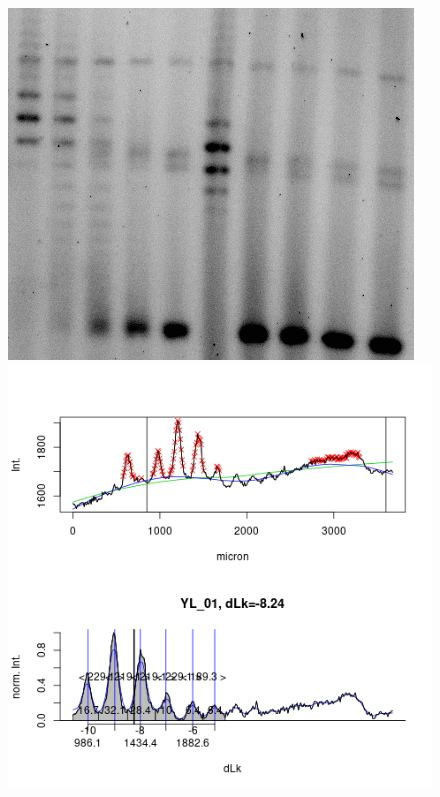 \documentclass[10pt,a4]{article}
\begin{document}
\begin{figure}
  \begin{minipage}{.27\textwidth}
    \includegraphics[width=\textwidth]{figures/diurnal/Y_CQ20_topoI_zoom_inv.png}
  \end{minipage}
  \begin{minipage}{.33\textwidth}
    \includegraphics[width=\textwidth]{figures/diurnal/YL_01.png}

\end{minipage}
\end{figure}
\end{document}
